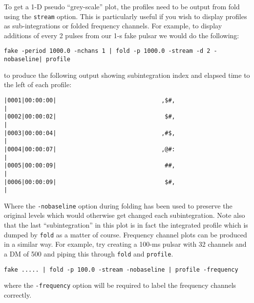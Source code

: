 \documentclass[11pt]{article}
\begin{document}
To get a 1-D pseudo ``grey-scale'' plot, the profiles need
to be output from fold using the {\tt stream} option. This is
particularly useful if you wish to display profiles as sub-integrations
or folded frequency channels. For example, to display additions of
every 2 pulses from our 1-s fake pulsar we would do the following:
\begin{verbatim}
fake -period 1000.0 -nchans 1 | fold -p 1000.0 -stream -d 2 -nobaseline| profile
\end{verbatim}
to produce the following output showing subintegration index and
elapsed time to the left of each profile:
\begin{verbatim}
|0001|00:00:00|                              ,$#,                              |
|0002|00:00:02|                               $#,                              |
|0003|00:00:04|                              ,#$,                              |
|0004|00:00:07|                              ,@#:                              |
|0005|00:00:09|                               ##,                              |
|0006|00:00:09|                               $#,                              |
\end{verbatim}
Where the {\tt -nobaseline} option during folding has been used to 
preserve the original levels which would otherwise get changed each
subintegration. Note also that the last ``subintegration'' in this
plot is in fact the integrated profile which is dumped by {\tt fold}
as a matter of course. Frequency channel plots can be produced in a 
similar way. For example, try creating a 100-ms pulsar with 32 channels
and a DM of 500 and piping this through {\tt fold} and {\tt profile}.
\begin{verbatim}
fake ..... | fold -p 100.0 -stream -nobaseline | profile -frequency
\end{verbatim}
where the {\tt -frequency} option will be required to label
the frequency channels correctly.
\end{document}
